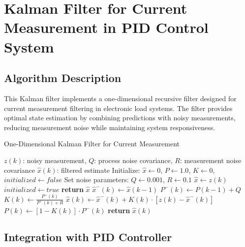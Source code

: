\documentclass{article}
\begin{document}
\section{Kalman Filter for Current Measurement in PID Control System}

\subsection{Algorithm Description}

This Kalman filter implements a one-dimensional recursive filter designed for current measurement filtering in electronic load systems. The filter provides optimal state estimation by combining predictions with noisy measurements, reducing measurement noise while maintaining system responsiveness.

\begin{algorithm}
\caption{One-Dimensional Kalman Filter for Current Measurement}
\label{alg:kalman_filter}
\begin{algorithmic}[1]
\REQUIRE $z(k)$: noisy measurement, $Q$: process noise covariance, $R$: measurement noise covariance
\ENSURE $\hat{x}(k)$: filtered estimate
\STATE Initialize: $\hat{x} \leftarrow 0$, $P \leftarrow 1.0$, $K \leftarrow 0$, $initialized \leftarrow false$
\STATE Set noise parameters: $Q \leftarrow 0.001$, $R \leftarrow 0.1$ 
        \STATE $\hat{x} \leftarrow z(k)$ 
        \STATE $initialized \leftarrow true$
        \STATE \textbf{return} $\hat{x}$
    \ENDIF
    \STATE {}
    \STATE $\hat{x}^{-}(k) \leftarrow \hat{x}(k-1)$ 
    \STATE $P^{-}(k) \leftarrow P(k-1) + Q$ 
    \STATE {}
    \STATE $K(k) \leftarrow \frac{P^{-}(k)}{P^{-}(k) + R}$ 
    \STATE $\hat{x}(k) \leftarrow \hat{x}^{-}(k) + K(k) \cdot [z(k) - \hat{x}^{-}(k)]$ 
    \STATE $P(k) \leftarrow [1 - K(k)] \cdot P^{-}(k)$ 
    \STATE \textbf{return} $\hat{x}(k)$
\ENDWHILE
\end{algorithmic}
\end{algorithm}

\subsection{Integration with PID Controller}
\end{document}

